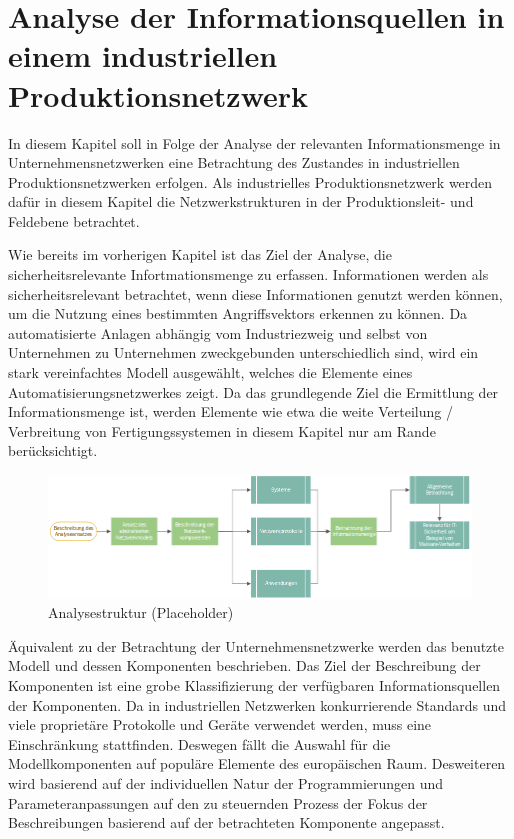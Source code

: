 \chapter{Analyse der Informationsquellen in einem industriellen Produktionsnetzwerk}
In diesem Kapitel soll in Folge der Analyse der relevanten Informationsmenge in Unternehmensnetzwerken eine Betrachtung des Zustandes in industriellen Produktionsnetzwerken erfolgen. Als industrielles Produktionsnetzwerk werden dafür in diesem Kapitel die Netzwerkstrukturen in der Produktionsleit- und Feldebene betrachtet.

\label{cha:Analyse der Informationsquellen in einem industriellen Produktionsnetzwerk}
Wie bereits im vorherigen Kapitel ist das Ziel der Analyse, die sicherheitsrelevante Infortmationsmenge zu erfassen. Informationen werden als sicherheitsrelevant betrachtet, wenn diese Informationen genutzt werden können, um die Nutzung eines bestimmten Angriffsvektors erkennen zu können. Da automatisierte Anlagen abhängig vom Industriezweig und selbst von Unternehmen zu Unternehmen zweckgebunden unterschiedlich sind, wird ein stark vereinfachtes Modell ausgewählt, welches die Elemente eines Automatisierungsnetzwerkes zeigt. Da das grundlegende Ziel die Ermittlung der Informationsmenge ist, werden Elemente wie etwa die weite Verteilung / Verbreitung von Fertigungssystemen in diesem Kapitel nur am Rande berücksichtigt. 

\begin{figure}[h]
\centering
\includegraphics[width=125mm]{Zeichnungen/Analyseansatz.png}
\caption{Analysestruktur (Placeholder)}
\label{fig:Analyseansatz (Placeholder)}
\end{figure}

Äquivalent zu der Betrachtung der Unternehmensnetzwerke werden das benutzte Modell und dessen Komponenten beschrieben. Das Ziel der Beschreibung der Komponenten ist eine grobe Klassifizierung der verfügbaren Informationsquellen der Komponenten. Da in industriellen Netzwerken konkurrierende Standards und viele proprietäre Protokolle und Geräte verwendet werden, muss eine Einschränkung stattfinden. Deswegen fällt die Auswahl für die Modellkomponenten auf populäre Elemente des europäischen Raum. Desweiteren wird basierend auf der individuellen Natur der Programmierungen und Parameteranpassungen auf den zu steuernden Prozess der Fokus der Beschreibungen basierend auf der betrachteten Komponente angepasst.

